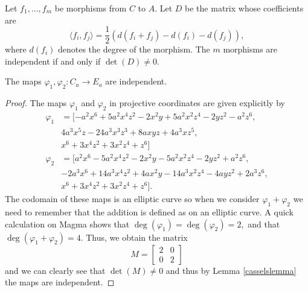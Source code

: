 \documentclass[10pt,a4paper]{amsart}
\begin{document}
\begin{lemma}[Cassels]\label{casselslemma}
    Let $f_1, \dots, f_m$ be morphisms from $C$ to $A$. Let $D$ be the matrix whose coefficients are
    $$\langle f_i, f_j \rangle = \frac{1}{2} \left( d(f_i + f_j) - d(f_i) - d(f_j) \right),$$
    where $d(f_i)$ denotes the degree of the morphism. The $m$ morphisms are independent if and only if $\det(D) \neq 0$.
\end{lemma}

\begin{lemma}
    The maps $\varphi_1, \varphi_2 \colon C_a \to E_a$ are independent.
\end{lemma}

\begin{proof}
    The maps $\varphi_1$ and $\varphi_2$ in projective coordinates are given explicitly by
\begin{align*}
    \varphi_1 &= [-a^2x^6 + 5a^2 x^4z^2 - 2x^2y + 5a^2x^2 z^4 - 2yz^2 - a^2 z^6, \\
    &4a^3x^5z - 24a^3 x^3z^3 +8axyz + 4a^3xz^5, \\
    &x^6 + 3x^4z^2 + 3x^2z^4 + z^6] \\
    \varphi_2 &= [a^2x^6 - 5a^2 x^4z^2 - 2x^2y - 5a^2x^2 z^4 - 2yz^2 + a^2 z^6, \\
    &-2a^3x^6 + 14a^3 x^4z^2 + 4ax^2y - 14a^3 x^2z^4 - 4ayz^2 + 2a^3z^6, \\
    &x^6 + 3x^4z^2 + 3x^2z^4 + z^6].
\end{align*}
The codomain of these maps is an elliptic curve so when we consider $\varphi_1 + \varphi_2$ we need to remember that the addition is defined as on an elliptic curve. A quick calculation on Magma shows that $\deg(\varphi_1) = \deg(\varphi_2) = 2,$ and that $\deg(\varphi_1 + \varphi_2) = 4$. Thus, we obtain the matrix
$$M = \begin{bmatrix}
    2 & 0 \\ 0 & 2
\end{bmatrix}$$
and we can clearly see that $\det(M) \neq 0$ and thus by Lemma \ref{casselslemma} the maps are independent.
\end{proof}
\end{document}
